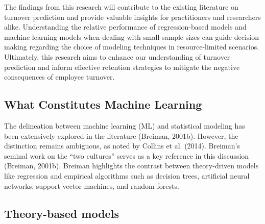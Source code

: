 \documentclass[
  man]{apa7}
\begin{document}
The findings from this research will contribute to the existing literature on turnover prediction and provide valuable insights for practitioners and researchers alike.
Understanding the relative performance of regression-based models and machine learning models when dealing with small sample sizes can guide decision-making regarding the choice of modeling techniques in resource-limited scenarios.
Ultimately, this research aims to enhance our understanding of turnover prediction and inform effective retention strategies to mitigate the negative consequences of employee turnover.

\subsection{What Constitutes Machine Learning}\label{what-constitutes-machine-learning}

The delineation between machine learning (ML) and statistical modeling has been extensively explored in the literature (Breiman, 2001b).
However, the distinction remains ambiguous, as noted by Collins et al. (2014).
Breiman's seminal work on the ``two cultures'' serves as a key reference in this discussion (Breiman, 2001b).
Breiman highlights the contrast between theory-driven models like regression and empirical algorithms such as decision trees, artificial neural networks, support vector machines, and random forests.

\subsection{Theory-based models}\label{theory-based-models}
\end{document}
